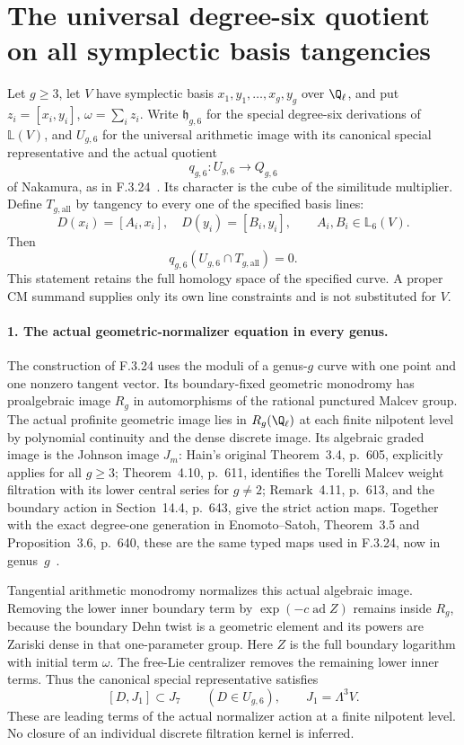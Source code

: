 \section*{The universal degree-six quotient on all symplectic basis tangencies}

Let $g\geq3$, let $V$ have symplectic basis
$x_1,y_1,\ldots,x_g,y_g$ over $\Q_\ell$, and put
$z_i=[x_i,y_i]$, $\omega=\sum_i z_i$.
Write $\mathfrak h_{g,6}$ for the special degree-six
derivations of $\mathbb L(V)$, and $U_{g,6}$ for the
universal arithmetic image with its canonical special
representative and the actual quotient
\[
                 q_{g,6}:U_{g,6}\longrightarrow Q_{g,6}
\]
of Nakamura, as in F.3.24~\cite[pp.~115--117]{AuditNakamura1996}. Its character is the cube
of the similitude multiplier. Define $T_{g,\mathrm{all}}$
by tangency to every one of the specified basis lines:
\[
 D(x_i)=[A_i,x_i],\quad D(y_i)=[B_i,y_i],
 \qquad A_i,B_i\in\mathbb L_6(V).
\]
Then
\[
                 q_{g,6}(U_{g,6}\cap T_{g,\mathrm{all}})=0.
                                                               \tag{AG.1}
\]
This statement retains the full homology space of the
specified curve. A proper CM summand supplies only its
own line constraints and is not substituted for $V$.

\paragraph{1. The actual geometric-normalizer equation in every genus.}
The construction of F.3.24 uses the moduli of a genus-$g$
curve with one point and one nonzero tangent vector.
Its boundary-fixed geometric monodromy has proalgebraic
image $R_g$ in automorphisms of the rational punctured
Malcev group. The actual profinite geometric image lies
in $R_g(\Q_\ell)$ at each finite nilpotent level by
polynomial continuity and the dense discrete image.
Its algebraic graded image is the Johnson image $J_m$:
Hain's original Theorem~3.4, p.~605, explicitly applies
for all $g\geq3$; Theorem~4.10, p.~611, identifies
the Torelli Malcev weight filtration with its lower
central series for $g\ne2$; Remark~4.11, p.~613,
and the boundary action in Section~14.4, p.~643,
give the strict action maps. Together with the exact
degree-one generation in Enomoto--Satoh, Theorem~3.5
and Proposition~3.6, p.~640, these are the same
typed maps used in F.3.24, now in genus~$g$~\cite{AuditHain1997Torelli,AuditEnomotoSatoh2014}.

Tangential arithmetic monodromy normalizes this actual
algebraic image. Removing the lower inner boundary
term by $\exp(-c\operatorname{ad}Z)$ remains inside
$R_g$, because the boundary Dehn twist is a geometric
element and its powers are Zariski dense in that
one-parameter group. Here $Z$ is the full boundary
logarithm with initial term $\omega$. The free-Lie
centralizer removes the remaining lower inner terms.
Thus the canonical special representative satisfies
\[
       [D,J_1]\subset J_7\qquad(D\in U_{g,6}),
       \qquad J_1=\Lambda^3V.                              \tag{AG.2}
\]
These are leading terms of the actual normalizer
action at a finite nilpotent level. No closure of
an individual discrete filtration kernel is inferred.

